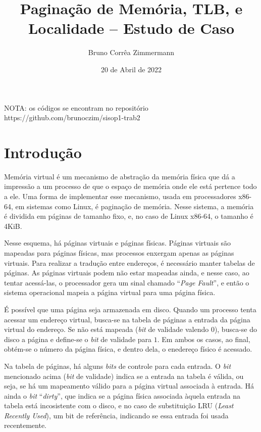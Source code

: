 \documentclass[a4paper]{article}
\title{Paginação de Memória, TLB, e Localidade -- Estudo de Caso}
\author{Bruno Corrêa Zimmermann}
\date{20 de Abril de 2022}
\begin{document}

\maketitle

NOTA: os códigos se encontram no repositório
https://github.com/brunoczim/sisop1-trab2

\section{Introdução}

Memória virtual é um mecanismo de abstração da memória física que dá a impressão
a um processo de que o espaço de memória onde ele está pertence todo a ele. Uma
forma de implementar esse mecanismo, usada em processadores x86-64, em sistemas
como Linux, é paginação de memória. Nesse sistema, a memória é dividida em
páginas de tamanho fixo, e, no caso de Linux x86-64, o tamanho é 4KiB.

Nesse esquema, há páginas virtuais e páginas físicas. Páginas virtuais são
mapeadas para páginas físicas, mas processos enxergam apenas as páginas
virtuais. Para realizar a tradução entre endereços, é necessário manter tabelas
de páginas. As páginas virtuais podem não estar mapeadas ainda, e nesse caso,
ao tentar acessá-las, o processador gera um sinal chamado
``\textit{Page Fault}'', e então o sistema operacional mapeia a página virtual
para uma página física.

É possível que uma página seja armazenada em disco. Quando um processo tenta
acessar um endereço virtual, busca-se na tabela de páginas a entrada da página
virtual do endereço. Se não está mapeada (\textit{bit} de validade valendo $0$),
busca-se do disco a página e define-se o \textit{bit} de validade para $1$. Em
ambos os casos, ao final, obtém-se o número da página física, e dentro dela, o
enedereço físico é acessado.

Na tabela de páginas, há alguns \textit{bits} de controle para cada entrada.
O \textit{bit} mencionado acima (\textit{bit} de validade) indica se a entrada
na tabela é válida, ou seja, se há um mapeamento válido para a página virtual
associada à entrada. Há ainda o \textit{bit} ``\textit{dirty}'', que indica se a
página física associada àquela entrada na tabela está incosistente com o disco,
e no caso de substituição LRU (\textit{Least Recently Used}), um bit de
referência, indicando se essa entrada foi usada recentemente.
\end{document}
